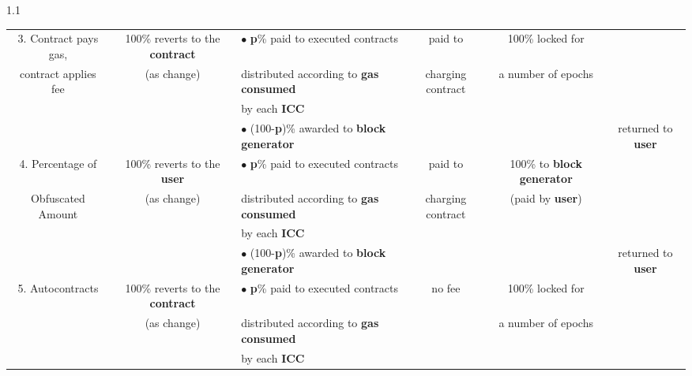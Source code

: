 \documentclass[twocolumn, nofootinbib]{revtex4-2} %
\newcommand{\emphasize}[1]{\textbf{#1}\xspace}
\newcommand{\blockgenerator}{\emphasize{block generator}}
\newcommand{\contract}{\emphasize{contract}}
\newcommand{\gasconsumed}{\emphasize{gas consumed}}
\newcommand{\icc}{\emphasize{ICC}}
\newcommand{\user}{\emphasize{user}}
\newcommand{\emphp}{\emphasize{p}}
\begin{document}
\begin{table*}[t]
\begin{spacing}{1.1}
{\begin{tabular}{| c | c | l | c | c | c |}
					3. Contract pays gas,
					& 100\% reverts to the \contract
                    & $\bullet$ \emphp\% paid to executed contracts
					& paid to
					& 100\% locked for
					&
					\\
					contract applies fee
					& (as change)
                    & \hspace{0.2cm} distributed according to \gasconsumed
					& charging contract
					& a number of epochs
					&
					\\
					&
                    & \hspace{0.2cm} by each \icc
					&
					&
					&
					\\ \hline
                    &
                    & $\bullet$ (100-\emphp)\% awarded to \blockgenerator
                    &
                    &
                    & \multirow{4}{*}{returned to \user}
                    \\
                    4. Percentage of
                    & 100\% reverts to the \user
                    & $\bullet$ \emphp\% paid to executed contracts
                    & paid to
                    & 100\% to \blockgenerator
                    &
                    \\
                    Obfuscated Amount
                    & (as change)
                    & \hspace{0.2cm} distributed according to \gasconsumed
                    & charging contract
                    & (paid by \user)
                    &
                    \\
                    &
                    & \hspace{0.2cm} by each \icc
                    &
                    &
                    &
                    \\ \hline
                    &
                    & $\bullet$ (100-\emphp)\% awarded to \blockgenerator
                    &
                    &
                    & \multirow{4}{*}{returned to \user}
                    \\
                    5. Autocontracts
                    & 100\% reverts to the \contract
                    & $\bullet$ \emphp\% paid to executed contracts
                    & no fee
                    & 100\% locked for
                    &
                    \\
                    & (as change)
                    & \hspace{0.2cm} distributed according to \gasconsumed
                    &
                    & a number of epochs
                    &
                    \\
                    &
                    & \hspace{0.2cm} by each \icc
                    &
                    &
                    &
                    \\ \hline
				\end{tabular}
			}
			\caption{Summary of how gas and fees are handled in each scenario.}
			\label{tab:gas}
		\end{spacing}
	\end{table*}
\end{document}
